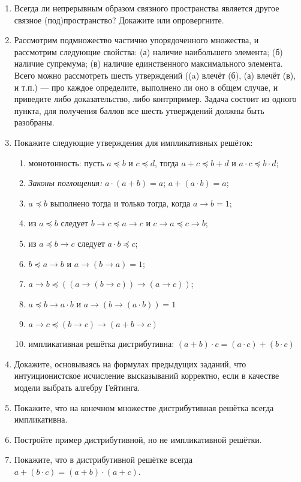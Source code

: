 \documentclass[10pt,a4paper,oneside]{article}
\begin{document}
\begin{enumerate}
\item Всегда ли непрерывным образом связного пространства является другое связное (под)пространство? Докажите или опровергните.

\item Рассмотрим подмножество частично упорядоченного множества, и рассмотрим следующие свойства:
(а) наличие наибольшего элемента; (б) наличие супремума;
(в) наличие единственного максимального элемента. Всего можно рассмотреть шесть утверждений ((a) влечёт (б), 
(а) влечёт (в), и т.п.) --- про каждое определите, выполнено ли оно в общем случае,
и приведите либо доказательство, либо контрпример. Задача состоит из одного пункта, для получения баллов 
все шесть утверждений должны быть разобраны.


\item Покажите следующие утверждения для импликативных решёток:
\begin{enumerate}
\item монотонность: пусть $a \preceq b$ и $c \preceq d$, тогда $a + c \preceq b + d$ и $a \cdot c \preceq b \cdot d$;
\item \emph{Законы поглощения:} $a \cdot (a + b) = a$; $a + (a \cdot b) = a$;
\item $a \preceq b$ выполнено тогда и только тогда, когда $a \rightarrow b = 1$;
\item из $a \preceq b$ следует $b\rightarrow c \preceq a\rightarrow c$ и $c\rightarrow a \preceq c \rightarrow b$;
\item из $a \preceq b \rightarrow c$ следует $a \cdot b \preceq c$;
\item $b \preceq a \rightarrow b$ и $a \rightarrow (b \rightarrow a) = 1$;
\item $a \rightarrow b \preceq ((a \rightarrow (b \rightarrow c)) \rightarrow (a \rightarrow c))$;
\item $a \preceq b \rightarrow a \cdot b$ и $a \rightarrow (b \rightarrow (a \cdot b)) = 1$
\item $a \rightarrow c \preceq (b \rightarrow c) \rightarrow (a + b \rightarrow c)$
\item импликативная решётка дистрибутивна: $(a + b) \cdot c = (a \cdot c) + (b \cdot c)$
\end{enumerate}

\item Докажите, основываясь на формулах предыдущих заданий, что интуиционистское исчисление высказываний
корректно, если в качестве модели выбрать алгебру Гейтинга.

\item Покажите, что на конечном множестве дистрибутивная решётка всегда импликативна.
\item Постройте пример дистрибутивной, но не импликативной решётки.
\item Покажите, что в дистрибутивной решётке всегда $a + (b \cdot c) = (a + b) \cdot (a + c)$.


\end{enumerate}
\end{document}

